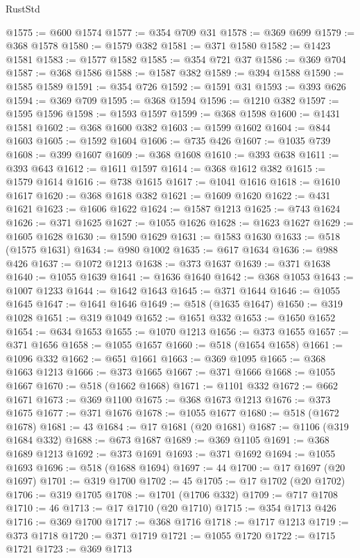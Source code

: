 \begin{lexlean}{RustStd}
\begin{coremodule}
@1575 := @600 @1574
@1577 := @354 @709 @31
@1578 := @369 @699
@1579 := @368 @1578
@1580 := @1579 @382
@1581 := @371 @1580
@1582 := @1423 @1581
@1583 := @1577 @1582
@1585 := @354 @721 @37
@1586 := @369 @704
@1587 := @368 @1586
@1588 := @1587 @382
@1589 := @394 @1588
@1590 := @1585 @1589
@1591 := @354 @726
@1592 := @1591 @31
@1593 := @393 @626
@1594 := @369 @709
@1595 := @368 @1594
@1596 := @1210 @382
@1597 := @1595 @1596
@1598 := @1593 @1597
@1599 := @368 @1598
@1600 := @1431 @1581
@1602 := @368 @1600 @382
@1603 := @1599 @1602
@1604 := @844 @1603
@1605 := @1592 @1604
@1606 := @735 @426
@1607 := @1035 @739
@1608 := @399 @1607
@1609 := @368 @1608
@1610 := @393 @638
@1611 := @393 @643
@1612 := @1611 @1597
@1614 := @368 @1612 @382
@1615 := @1579 @1614
@1616 := @738 @1615
@1617 := @1041 @1616
@1618 := @1610 @1617
@1620 := @368 @1618 @382
@1621 := @1609 @1620
@1622 := @431 @1621
@1623 := @1606 @1622
@1624 := @1587 @1213
@1625 := @743 @1624
@1626 := @371 @1625
@1627 := @1055 @1626
@1628 := @1623 @1627
@1629 := @1605 @1628
@1630 := @1590 @1629
@1631 := @1583 @1630
@1633 := @518 (@1575 @1631)
@1634 := @980 @1002
@1635 := @617 @1634
@1636 := @988 @426
@1637 := @1072 @1213
@1638 := @373 @1637
@1639 := @371 @1638
@1640 := @1055 @1639
@1641 := @1636 @1640
@1642 := @368 @1053
@1643 := @1007 @1233
@1644 := @1642 @1643
@1645 := @371 @1644
@1646 := @1055 @1645
@1647 := @1641 @1646
@1649 := @518 (@1635 @1647)
@1650 := @319 @1028
@1651 := @319 @1049
@1652 := @1651 @332
@1653 := @1650 @1652
@1654 := @634 @1653
@1655 := @1070 @1213
@1656 := @373 @1655
@1657 := @371 @1656
@1658 := @1055 @1657
@1660 := @518 (@1654 @1658)
@1661 := @1096 @332
@1662 := @651 @1661
@1663 := @369 @1095
@1665 := @368 @1663 @1213
@1666 := @373 @1665
@1667 := @371 @1666
@1668 := @1055 @1667
@1670 := @518 (@1662 @1668)
@1671 := @1101 @332
@1672 := @662 @1671
@1673 := @369 @1100
@1675 := @368 @1673 @1213
@1676 := @373 @1675
@1677 := @371 @1676
@1678 := @1055 @1677
@1680 := @518 (@1672 @1678)
@1681 := 43
@1684 := @17 @1681 (@20 @1681)
@1687 := @1106 (@319 @1684 @332)
@1688 := @673 @1687
@1689 := @369 @1105
@1691 := @368 @1689 @1213
@1692 := @373 @1691
@1693 := @371 @1692
@1694 := @1055 @1693
@1696 := @518 (@1688 @1694)
@1697 := 44
@1700 := @17 @1697 (@20 @1697)
@1701 := @319 @1700
@1702 := 45
@1705 := @17 @1702 (@20 @1702)
@1706 := @319 @1705
@1708 := @1701 (@1706 @332)
@1709 := @717 @1708
@1710 := 46
@1713 := @17 @1710 (@20 @1710)
@1715 := @354 @1713 @426
@1716 := @369 @1700
@1717 := @368 @1716
@1718 := @1717 @1213
@1719 := @373 @1718
@1720 := @371 @1719
@1721 := @1055 @1720
@1722 := @1715 @1721
@1723 := @369 @1713

\end{coremodule}
\end{lexlean}
